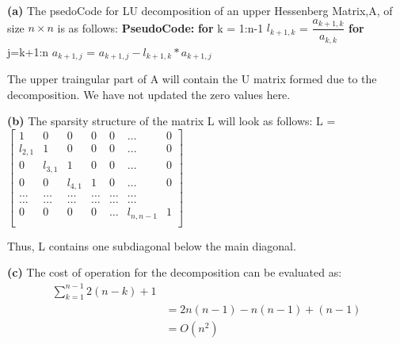 \documentclass{article}
\renewcommand\part[1]{\vspace{.10in}\textbf{(#1)}}
\newcommand\pseudoCode{\vspace{.10in}\textbf{PseudoCode: }}
\begin{document}
\part{a}
The psedoCode for LU decomposition of an upper Hessenberg Matrix,A, of size $n \times n$ is as follows:\newline
\pseudoCode \newline
\hspace*{0.5cm} \textbf {for} k = 1:n-1 \newline
\hspace*{1cm}      $l_{k+1,k}$ = $\dfrac{a_{k+1,k}}{a_{k,k}}$ \newline
\hspace*{1cm}    \textbf {for} j=k+1:n \newline
\hspace*{1.5cm}     $ a_{k+1,j}$ = $a_{k+1,j} - l_{k+1,k}*a_{k+1,j}$ \newline

The upper traingular part of A will contain the U matrix formed due to the decomposition. We have not updated the zero values here. 

\part{b}
The sparsity structure of the matrix L will look as follows: \newline
L = $\begin{bmatrix} 
1 & 0 & 0 & 0 & 0 &\dots & 0 \\
l_{2,1} & 1 & 0 & 0 & 0 &\dots & 0 \\
0 & l_{3,1} & 1 & 0 & 0 & \dots & 0 \\
0 & 0 & l_{4,1} & 1 & 0 & \dots & 0 \\
\dots & \dots & \dots & \dots & \dots & \dots \\
\dots & \dots & \dots & \dots & \dots & \dots \\
0 & 0 & 0 & 0 & \dots &    l_{n,n-1} & 1 \\

\end{bmatrix}$

Thus, L contains one subdiagonal below the main diagonal. \newline

\part{c} 
The cost of operation for the decomposition  can be evaluated as: \newline
\begin{align*}
   \sum_{k=1}^{n-1} 2(n-k) + 1 \\
   &= 2n(n-1) -n(n-1) + (n-1) \\
   &= O(n^2) \\
\end{align*}
   
\end{document}

